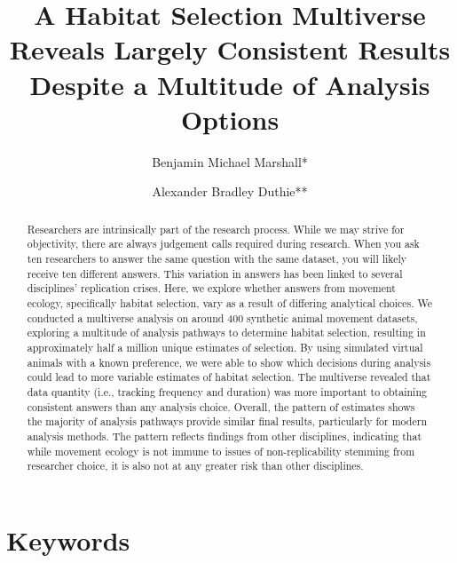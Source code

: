 \documentclass[10pt,a4paper]{article}
\begin{document}
\pagestyle{fancy}

\title{A Habitat Selection Multiverse Reveals Largely Consistent Results Despite a Multitude of Analysis Options}
\author[1]{Benjamin Michael Marshall*}
\author[1]{Alexander Bradley Duthie**}


\maketitle
\thispagestyle{fancy}

\begin{abstract}

Researchers are intrinsically part of the research process. While we may strive for objectivity, there are always judgement calls required during research. When you ask ten researchers to answer the same question with the same dataset, you will likely receive ten different answers. This variation in answers has been linked to several disciplines' replication crises. Here, we explore whether answers from movement ecology, specifically habitat selection, vary as a result of differing analytical choices. We conducted a multiverse analysis on around 400 synthetic animal movement datasets, exploring a multitude of analysis pathways to determine habitat selection, resulting in approximately half a million unique estimates of selection. By using simulated virtual animals with a known preference, we were able to show which decisions during analysis could lead to more variable estimates of habitat selection. The multiverse revealed that data quantity (i.e., tracking frequency and duration) was more important to obtaining consistent answers than any analysis choice. Overall, the pattern of estimates shows the majority of analysis pathways provide similar final results, particularly for modern analysis methods. The pattern reflects findings from other disciplines, indicating that while movement ecology is not immune to issues of non-replicability stemming from researcher choice, it is also not at any greater risk than other disciplines.

\end{abstract}

\section*{Keywords}
\end{document}

